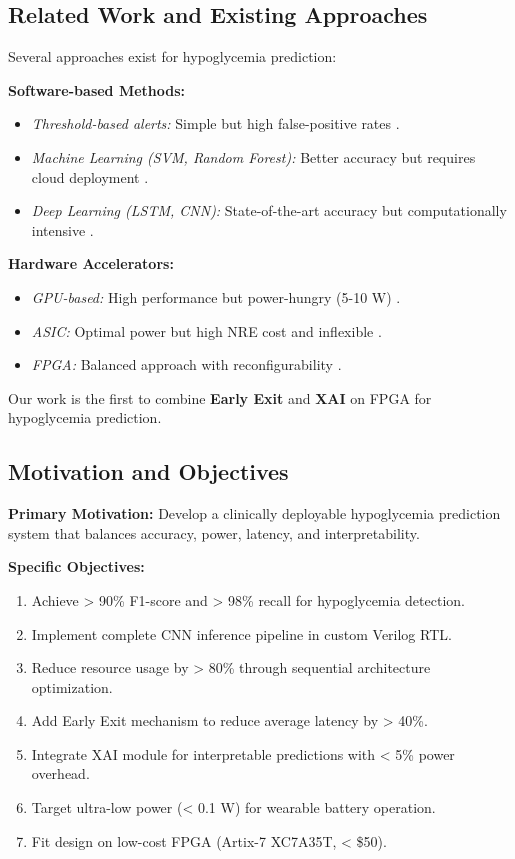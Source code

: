 \documentclass[11pt, a4paper]{article}
\begin{document}
\subsection{Related Work and Existing Approaches}

Several approaches exist for hypoglycemia prediction:

\textbf{Software-based Methods:}
\begin{itemize}
    \item \textit{Threshold-based alerts:} Simple but high false-positive rates \cite{chico2018}.
    \item \textit{Machine Learning (SVM, Random Forest):} Better accuracy but requires cloud deployment \cite{liu2020}.
    \item \textit{Deep Learning (LSTM, CNN):} State-of-the-art accuracy but computationally intensive \cite{sun2021}.
\end{itemize}

\textbf{Hardware Accelerators:}
\begin{itemize}
    \item \textit{GPU-based:} High performance but power-hungry (5-10 W) \cite{yang2019}.
    \item \textit{ASIC:} Optimal power but high NRE cost and inflexible \cite{chen2020}.
    \item \textit{FPGA:} Balanced approach with reconfigurability \cite{zhang2021}.
\end{itemize}

Our work is the first to combine \textbf{Early Exit} and \textbf{XAI} on FPGA for hypoglycemia prediction.

\subsection{Motivation and Objectives}

\textbf{Primary Motivation:} Develop a clinically deployable hypoglycemia prediction system that balances accuracy, power, latency, and interpretability.

\textbf{Specific Objectives:}
\begin{enumerate}
    \item Achieve > 90\% F1-score and > 98\% recall for hypoglycemia detection.
    \item Implement complete CNN inference pipeline in custom Verilog RTL.
    \item Reduce resource usage by > 80\% through sequential architecture optimization.
    \item Add Early Exit mechanism to reduce average latency by > 40\%.
    \item Integrate XAI module for interpretable predictions with < 5\% power overhead.
    \item Target ultra-low power (< 0.1 W) for wearable battery operation.
    \item Fit design on low-cost FPGA (Artix-7 XC7A35T, < \$50).
\end{enumerate}
\end{document}
